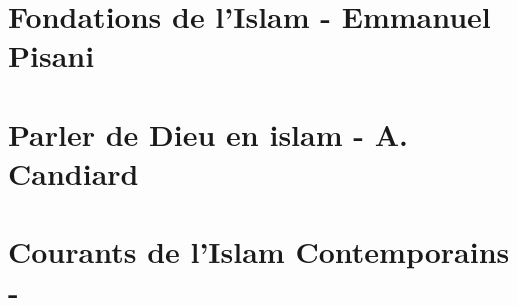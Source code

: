 \documentclass[oneside,10pt]{book} %
\begin{document}
 
\part{Fondations de l'Islam - Emmanuel Pisani}

\FloatBarrier







%
%
\part{Parler de Dieu en islam - A. Candiard}
 
 
 
 
  
  
  
  
 




\part{Courants de l'Islam Contemporains - }


%















 
\end{document}
